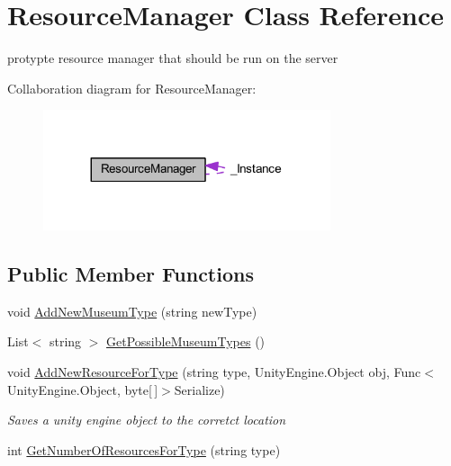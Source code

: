 \hypertarget{class_resource_manager}{}\section{Resource\+Manager Class Reference}
\label{class_resource_manager}


protypte resource manager that should be run on the server  




Collaboration diagram for Resource\+Manager\+:
\nopagebreak
\begin{figure}[H]
\begin{center}
\leavevmode
\includegraphics[width=239pt]{class_resource_manager__coll__graph}
\end{center}
\end{figure}
\subsection*{Public Member Functions}
\begin{DoxyCompactItemize}
\item 
void \mbox{\hyperlink{class_resource_manager_ad36cc6bc6286e385b6b51cca3a3284a2}{Add\+New\+Museum\+Type}} (string new\+Type)
\item 
List$<$ string $>$ \mbox{\hyperlink{class_resource_manager_a72e9243fdaf77f0fb479f0cf4070ea22}{Get\+Possible\+Museum\+Types}} ()
\item 
void \mbox{\hyperlink{class_resource_manager_a00d051848c81ffb1dbb180861895b127}{Add\+New\+Resource\+For\+Type}} (string type, Unity\+Engine.\+Object obj, Func$<$ Unity\+Engine.\+Object, byte\mbox{[}$\,$\mbox{]}$>$Serialize)
\begin{DoxyCompactList}\small\item\em Saves a unity engine object to the corretct location \end{DoxyCompactList}\item 
int \mbox{\hyperlink{class_resource_manager_a9ed8a67faa621d30d9790c0847f45a72}{Get\+Number\+Of\+Resources\+For\+Type}} (string type)
\end{DoxyCompactItemize}
